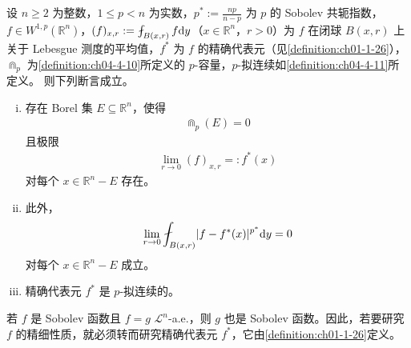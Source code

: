 \documentclass[../../main.tex]{subfiles}%
\begin{document}
\begin{theorem}\label{theorem:ch04-4-19}
设 $n\geqslant2$ 为整数，$1\leqslant p<n$ 为实数，$p^*:=\frac{np}{n-p}$ 为 $p$ 的 Sobolev 共轭指数，$f\in W^{1,p}(\mathbb{R}^n)$，$(f)_{x,r}:=\fint_{B(x,r)}f\diff y$（$x\in\mathbb{R}^n$，$r>0$）为 $f$ 在闭球 $B(x,r)$ 上关于 Lebesgue 测度的平均值，$f^*$ 为 $f$ 的精确代表元（见\cref{definition:ch01-1-26}），$\Cap_p$ 为\cref{definition:ch04-4-10}所定义的 $p$-容量，$p$-拟连续如\cref{definition:ch04-4-11}所定义。%
则下列断言成立。
\begin{enumerate}[(i)]
\item 存在 Borel 集 $E\subseteq\mathbb{R}^n$，使得
\begin{align*}
\Cap_p(E)=0
\end{align*}
且极限
\begin{align*}
\lim_{r\to0}(f)_{x,r}=:f^*(x)
\end{align*}
对每个 $x\in\mathbb{R}^n-E$ 存在。
\item 此外，
\begin{align*}
\lim_{r\to0}\fint_{B(x,r)}\lvert f-f^*(x)\rvert^{p^*}\diff y=0
\end{align*}
对每个 $x\in\mathbb{R}^n-E$ 成立。
\item 精确代表元 $f^*$ 是 $p$-拟连续的。
\end{enumerate}
\end{theorem}

\begin{remark}\label{remark:ch04-thm-4-19-代表元}
若 $f$ 是 Sobolev 函数且 $f=g$ $\mathcal{L}^n$-a.e.，则 $g$ 也是 Sobolev 函数。因此，若要研究 $f$ 的精细性质，就必须转而研究精确代表元 $f^*$，它由\cref{definition:ch01-1-26}定义。%
\end{remark}
\end{document}
